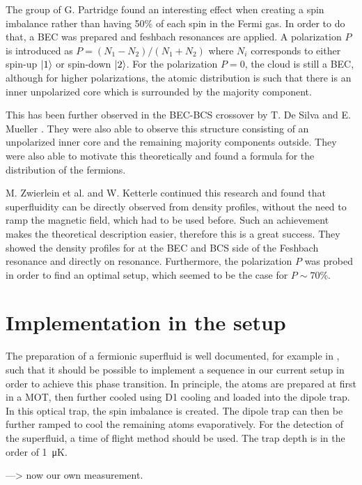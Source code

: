 The group of G. Partridge found an interesting effect when creating a spin imbalance rather than having 50\% of each spin in the Fermi gas. In order to do that, a BEC was prepared and feshbach resonances are applied. A polarization $P$ is introduced as $P=\left( N_1-N_2\right) / \left( N_1+N_2\right)$ where $N_i$ corresponds to either spin-up $\ket{1}$ or spin-down $\ket{2}$. For the polarization $P=0$, the cloud is still a BEC, although for higher polarizations, the atomic distribution is such that there is an inner unpolarized core which is surrounded by the majority component.

This has been further observed in the BEC-BCS crossover by T. De Silva and E. Mueller . They were also able to observe this structure consisting of an unpolarized inner core and the remaining majority components outside. They were also able to motivate this theoretically and found a formula for the distribution of the fermions.

M. Zwierlein et al. and W. Ketterle  continued this research and found that superfluidity can be directly observed from density profiles, without the need to ramp the magnetic field, which had to be used before. Such an achievement makes the theoretical description easier, therefore this is a great success.
They showed the density profiles for at the BEC and BCS side of the Feshbach resonance and directly on resonance. Furthermore, the polarization $P$ was probed in order to find an optimal setup, which seemed to be the case for $P \sim 70\%$.

\section{Implementation in the setup}

The preparation of a fermionic superfluid is well documented, for example in , such that it should be possible to implement a sequence in our current setup in order to achieve this phase transition. In principle, the atoms are prepared at first in a MOT, then further cooled using D1 cooling  and loaded into the dipole trap. In this optical trap, the spin imbalance is created. The dipole trap can then be further ramped to cool the remaining atoms evaporatively. For the detection of the superfluid, a time of flight method should be used. The trap depth is in the order of \SI{1}{\micro\kelvin}.

---> now our own measurement.